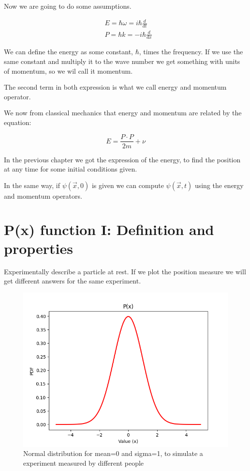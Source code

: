 Now we are going to do some assumptions.

\begin{equation}
    \label{Energy_Momentum}
    \begin{split}
        &E = \hbar \omega = i\hbar\frac{d}{dt}\\
        &P = \hbar k = -i\hbar\frac{d}{dx}
    \end{split}
\end{equation}

We can define the energy as some constant, $\hbar$, times the frequency. If we use the same constant and multiply it to the wave number we get something with units of momentum, so we wil call it momentum.

The second term in both expression is what we call energy and momentum operator.

We now from classical mechanics that energy and momentum are related by the equation:

\begin{equation}
    \label{Energy(momentum)}
    E = \frac{P\cdot P}{2m} + \nu
\end{equation}

In the previous chapter we got the expression of the energy, to find the position at any time for some initial conditions given.

In the same way, if $\psi(\vec{x},0)$ is given we can compute $\psi(\vec{x},t)$ using the energy and momentum operators.

\section{P(x) function I: Definition and properties}

Experimentally describe a particle at rest. If we plot the position measure we will get different answers for the same experiment.

\begin{figure}[h]
    \includegraphics{images2/PDF_function.png}
    \caption{Normal distribution for mean=0 and sigma=1, to simulate a experiment measured by different people}
    \label{PDF_function}
\end{figure}


